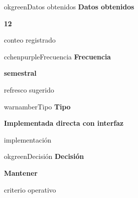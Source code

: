 \documentclass[9pt,a4paper]{extarticle}
\begin{document}
\vspace{0.04cm}
\begin{minipage}{0.24\textwidth}
\begin{metricbox}{okgreen}{Datos obtenidos}
{\large\bfseries Datos obtenidos}\par
{\Large\bfseries 12}\par
{\normalsize conteo registrado}
\end{metricbox}
\end{minipage}\hfill
\begin{minipage}{0.24\textwidth}
\begin{metricbox}{cchenpurple}{Frecuencia}
{\large\bfseries Frecuencia}\par
{\large\bfseries semestral}\par
{\normalsize refresco sugerido}
\end{metricbox}
\end{minipage}\hfill
\begin{minipage}{0.24\textwidth}
\begin{metricbox}{warnamber}{Tipo}
{\large\bfseries Tipo}\par
{\normalsize\bfseries Implementada directa con interfaz}\par
{\normalsize implementación}
\end{metricbox}
\end{minipage}\hfill
\begin{minipage}{0.24\textwidth}
\begin{metricbox}{okgreen}{Decisión}
{\large\bfseries Decisión}\par
{\normalsize\bfseries Mantener}\par
{\normalsize criterio operativo}
\end{metricbox}
\end{minipage}
\end{document}
